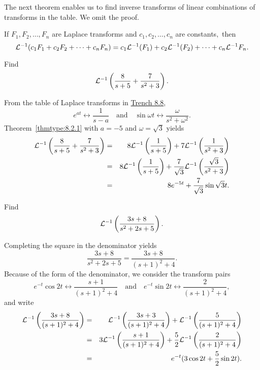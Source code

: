 \documentclass{ximera}
\begin{document}
The next theorem enables us to find inverse transforms of linear
combinations of transforms in the table. We omit the proof.

\begin{theorem}\label{thmtype:8.2.1}
If $F_1, F_2, \dots, F_n$ are Laplace transforms and
$c_1, c_2, \dots, c_n$ are constants$,$ then
$$
{\cal L}^{-1}(c_1F_1+c_2F_2+\cdots+c_nF_n)=c_1{\cal L}^{-1}(F_1)+c_2{\cal
L}^{-1}(F_2)+\cdots+c_n{\cal L}^{-1}F_n.
$$
\end{theorem}

\begin{example}\label{example:8.2.2} Find
$$
{\cal L}^{-1}\left(\frac{8}{s+5}+\frac{7}{s^2+3}\right).
$$


\begin{explanation}
From the table of Laplace transforms in \href{https://xerxes.ximera.org/differentialequations/main/laplaceTable/laplaceTable}{Trench 8.8},
$$
e^{at}\leftrightarrow \frac{1}{s-a}\quad\mbox{and}\quad
\sin\omega t\leftrightarrow \frac{\omega}{s^2+\omega^2}.
$$
Theorem~\ref{thmtype:8.2.1}
with $a=-5$ and   $\omega=\sqrt3$
yields
\begin{eqnarray*}
{\cal L}^{-1}\left(\frac{8}{s+5}+\frac{7}{s^2+3}\right)&=&
8{\cal L}^{-1}\left(\frac{1}{s+5}\right)+7{\cal L}^{-1}\left(\frac{1}{s^2+3}\right)\\
&=&
8{\cal L}^{-1}\left(\frac{1}{s+5}\right)+\frac{7}{\sqrt3}{\cal
L}^{-1}\left(\frac{\sqrt3}{s^2+3}\right)\\&=&8e^{-5t}+\frac{7}{\sqrt3}\sin\sqrt3t.
\end{eqnarray*}
\end{explanation}
\end{example}

\begin{example}\label{example:8.2.3} Find
$$
{\cal L}^{-1}\left(\frac{3s+8}{s^2+2s+5}\right).
$$

\begin{explanation}
Completing the square in the denominator yields
$$
\frac{3s+8}{s^2+2s+5}=\frac{3s+8}{(s+1)^2+4}.
$$
Because of the form of the denominator, we consider
the transform pairs
$$
 e^{-t}\cos 2t\leftrightarrow\frac{s+1}{(s+1)^2+4}
\quad\mbox{and}\quad
 e^{-t}\sin 2t\leftrightarrow\frac{2}{(s+1)^2+4},
$$
and write
\begin{eqnarray*}
{\cal L}^{-1}\left(\frac{3s+8}{(s+1)^2+4}\right)&=&
{\cal L}^{-1}\left(\frac{3s+3}{(s+1)^2+4}\right)+
{\cal L}^{-1}\left(\frac{5}{(s+1)^2+4}\right)\\&=&
3{\cal L}^{-1}\left(\frac{s+1}{(s+1)^2+4}\right)+
\frac{5}{2}{\cal L}^{-1}\left(\frac{2}{(s+1)^2+4}\right)\\&=&
e^{-t}(3\cos 2t+\frac{5}{2}\sin 2t).
\end{eqnarray*}
\end{explanation}
\end{example}
\end{document}
